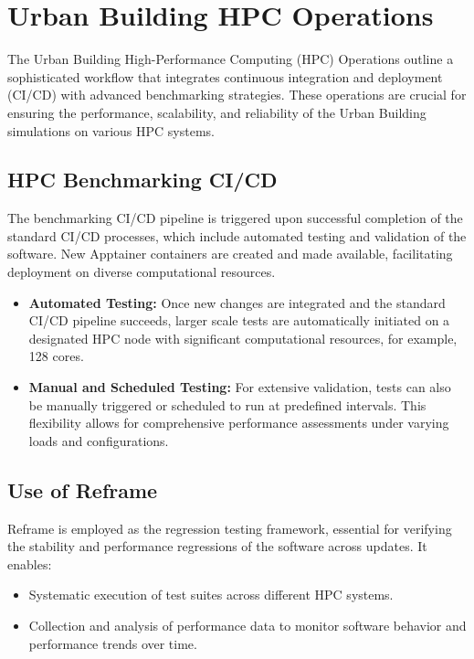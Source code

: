 \documentclass[runningheads]{llncs}
\begin{document}
\section{Urban Building HPC Operations}

The Urban Building High-Performance Computing (HPC) Operations outline a sophisticated workflow that integrates continuous integration and deployment (CI/CD) with advanced benchmarking strategies. These operations are crucial for ensuring the performance, scalability, and reliability of the Urban Building simulations on various HPC systems.

\subsection{HPC Benchmarking CI/CD}
The benchmarking CI/CD pipeline is triggered upon successful completion of the standard CI/CD processes, which include automated testing and validation of the software. New Apptainer containers are created and made available, facilitating deployment on diverse computational resources.

\begin{itemize}
    \item \textbf{Automated Testing:} Once new changes are integrated and the standard CI/CD pipeline succeeds, larger scale tests are automatically initiated on a designated HPC node with significant computational resources, for example, 128 cores.
    \item \textbf{Manual and Scheduled Testing:} For extensive validation, tests can also be manually triggered or scheduled to run at predefined intervals. This flexibility allows for comprehensive performance assessments under varying loads and configurations.
\end{itemize}

\subsection{Use of Reframe}
Reframe is employed as the regression testing framework, essential for verifying the stability and performance regressions of the software across updates. It enables:
\begin{itemize}
    \item Systematic execution of test suites across different HPC systems.
    \item Collection and analysis of performance data to monitor software behavior and performance trends over time.
\end{itemize}
\end{document}
